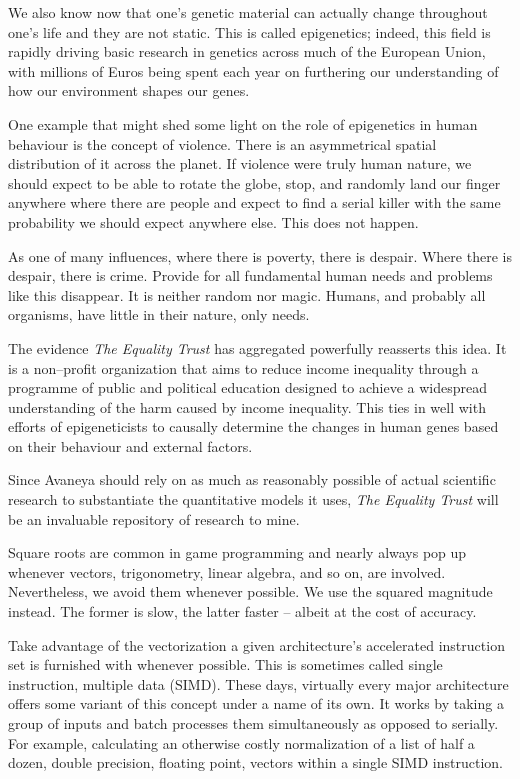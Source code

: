 We also know now that one's genetic material can actually change throughout one's life and they are not static. This is called epigenetics; indeed, this field is rapidly driving basic research in genetics across much of the European Union, with millions of Euros being spent each year on furthering our understanding of how our environment shapes our genes.

One example that might shed some light on the role of epigenetics in human behaviour is the concept of violence. There is an asymmetrical spatial distribution of it across the planet. If violence were truly human nature, we should expect to be able to rotate the globe, stop, and randomly land our finger anywhere where there are people and expect to find a serial killer with the same  probability we should expect anywhere else. This does not happen. 

As one of many influences, where there is poverty, there is despair. Where there is despair, there is crime. Provide for all fundamental human needs and problems like this disappear. It is neither random nor magic. Humans, and probably all organisms, have little in their nature, only needs.

The evidence {\it The Equality Trust} has aggregated powerfully reasserts this idea. It is a non--profit organization that aims to reduce income inequality through a programme of public and political education designed to achieve a widespread understanding of the harm caused by income inequality. This ties in well with efforts of epigeneticists to causally determine the changes in human genes based on their behaviour and external factors.

Since Avaneya should rely on as much as reasonably possible of actual scientific research to substantiate the quantitative models it uses, {\it The Equality Trust} will be an invaluable repository of research to mine.

Square roots are common in game programming and nearly always pop up whenever vectors, trigonometry, linear algebra, and so on, are involved. Nevertheless, we avoid them whenever possible. We use the squared magnitude instead. The former is slow, the latter faster -- albeit at the cost of accuracy.

Take advantage of the vectorization a given architecture's accelerated instruction set is furnished with whenever possible. This is sometimes called single instruction, multiple data (SIMD). These days, virtually every major architecture offers some variant of this concept under a name of its own. It works by taking a group of inputs and batch processes them simultaneously as opposed to serially. For example, calculating an otherwise costly normalization of a list of half a dozen, double precision, floating point, vectors within a single SIMD instruction.

